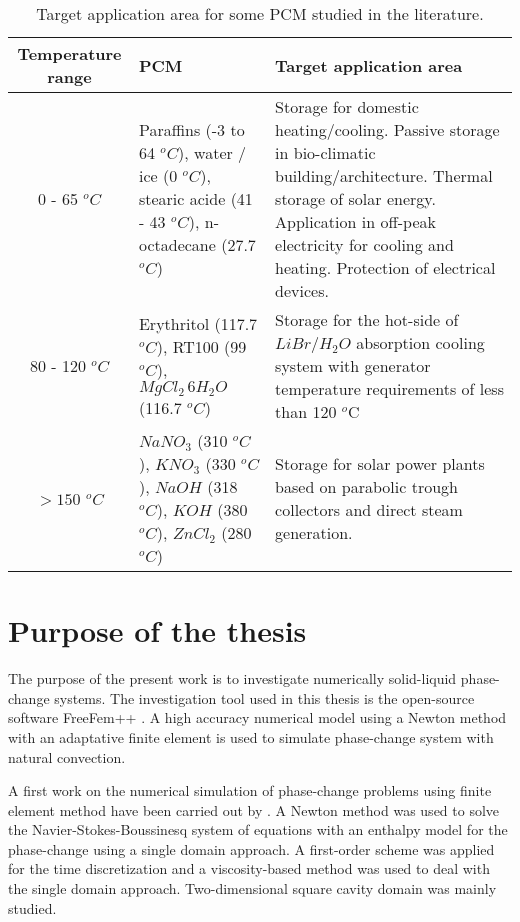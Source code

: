\begin{table}[h!]
	\begin{flushleft}
		\begin{tabularx}{\linewidth}{cXX}
					Temperature range & PCM & Target application area \\ \hline \hline
			0 - 65 $^o C$ &    Paraffins (-3 to 64 $^o C$), water / ice  (0 $^o C$), stearic acide  (41 - 43 $^o C$), {n-octadecane  (27.7 $^o C$)}   &   Storage for domestic heating/cooling. Passive storage in bio-climatic building/architecture. Thermal storage of solar energy. Application in off-peak electricity for cooling and heating. Protection of electrical devices.\\ \hline
			80 - 120 $^o C$ &    Erythritol (117.7 $^o C$), RT100  (99 $^o C$), $MgCl_2 \, 6H_2O$  (116.7 $^o C$)   &   Storage for the hot-side of $LiBr/H_2O$ absorption cooling system with generator temperature requirements of less than 120 $^o$C\\ \hline
			$ > 150 $ $^o C$ &    $NaNO_3$ (310 $^o C$), $KNO_3$  (330 $^o C$), $NaOH$  (318 $^o C$),  $KOH$  (380 $^o C$), $ZnCl_2$  (280 $^o C$)  &   Storage for solar power plants based on parabolic trough collectors and direct steam generation.\\ 

		\end{tabularx}
	\end{flushleft}
	\caption {Target application area for some PCM studied in the literature.}
	\label{tab-PCM-app}
\end{table}

\section{Purpose of the thesis}
The purpose of the present work is to investigate numerically solid-liquid phase-change systems.
The investigation tool used in this thesis is the open-source software FreeFem++ \citep{freefem,hecht-2012-JNM}.
A high accuracy numerical model using a Newton method with an adaptative finite element is used to simulate phase-change system with natural convection.

A first work on the numerical simulation of phase-change problems using finite element method have been carried out by \cite{dan-2014-JCP}.
A Newton method was used to solve the Navier-Stokes-Boussinesq system of equations with an enthalpy model for the phase-change using a single domain approach.
A first-order scheme was applied for the time discretization and a viscosity-based method was used to deal with the single domain approach.
Two-dimensional square cavity domain was mainly studied.

